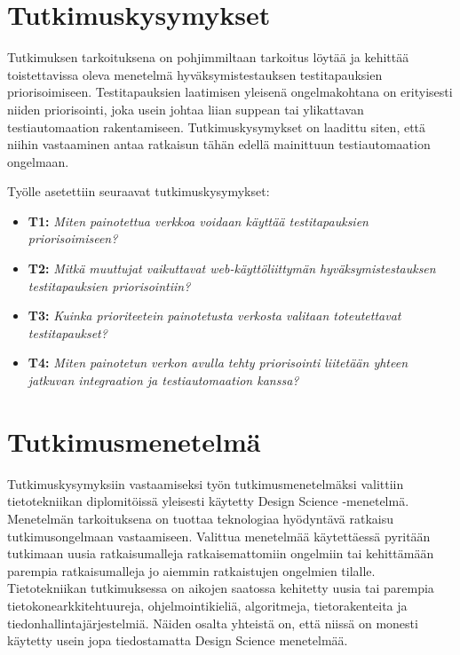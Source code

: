 \section{Tutkimuskysymykset} \label{ch:06_tutkimuskysymykset}

  Tutkimuksen tarkoituksena on pohjimmiltaan tarkoitus löytää ja kehittää toistettavissa oleva menetelmä hyväksymistestauksen testitapauksien priorisoimiseen.
  Testitapauksien laatimisen yleisenä ongelmakohtana on erityisesti niiden priorisointi, joka usein johtaa liian suppean tai ylikattavan testiautomaation rakentamiseen.
  Tutkimuskysymykset on laadittu siten, että niihin vastaaminen antaa ratkaisun tähän edellä mainittuun testiautomaation ongelmaan.

  Työlle asetettiin seuraavat tutkimuskysymykset:
  \begin{itemize}
    \item \textbf{T1:} \emph{Miten painotettua verkkoa voidaan käyttää testitapauksien priorisoimiseen?}
    \item \textbf{T2:} \emph{Mitkä muuttujat vaikuttavat web-käyttöliittymän hyväksymistestauksen testitapauksien priorisointiin?}
    \item \textbf{T3:} \emph{Kuinka prioriteetein painotetusta verkosta valitaan toteutettavat testitapaukset?}
    \item \textbf{T4:} \emph{Miten painotetun verkon avulla tehty priorisointi liitetään yhteen jatkuvan integraation ja testiautomaation kanssa?}
  \end{itemize}

  \section{Tutkimusmenetelmä} \label{ch:06_tutkimusmenetelma}

  Tutkimuskysymyksiin vastaamiseksi työn tutkimusmenetelmäksi valittiin tietotekniikan diplomitöissä yleisesti käytetty Design Science -menetelmä.
  Menetelmän tarkoituksena on tuottaa teknologiaa hyödyntävä ratkaisu tutkimusongelmaan vastaamiseen.
  Valittua menetelmää käytettäessä pyritään tutkimaan uusia ratkaisumalleja ratkaisemattomiin ongelmiin tai kehittämään parempia ratkaisumalleja jo aiemmin ratkaistujen ongelmien tilalle.
  Tietotekniikan tutkimuksessa on aikojen saatossa kehitetty uusia tai parempia tietokonearkkitehtuureja, ohjelmointikieliä, algoritmeja, tietorakenteita ja tiedonhallintajärjestelmiä.
  Näiden osalta yhteistä on, että niissä on monesti käytetty usein jopa tiedostamatta Design Science menetelmää. %


